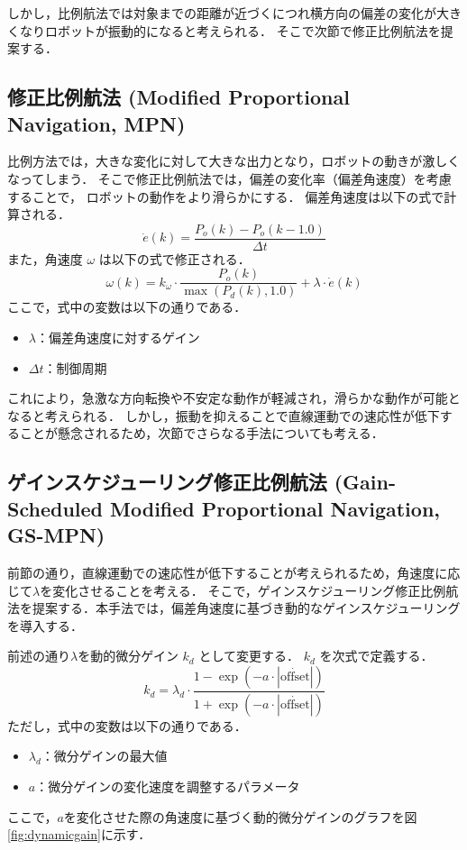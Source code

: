 しかし，比例航法では対象までの距離が近づくにつれ横方向の偏差の変化が大きくなりロボットが振動的になると考えられる．
そこで次節で修正比例航法を提案する．

\subsection{修正比例航法 (Modified Proportional Navigation, MPN)}
比例方法では，大きな変化に対して大きな出力となり，ロボットの動きが激しくなってしまう．
そこで修正比例航法では，偏差の変化率（偏差角速度）を考慮することで，
ロボットの動作をより滑らかにする．
偏差角速度は以下の式で計算される．
\begin{equation}
    \dot{e}(k) = \frac{P_o(k) - P_o(k-1.0)}{\Delta t}
\end{equation}
また，角速度 \(\omega\) は以下の式で修正される．
\begin{equation}
    \omega(k) = k_\omega \cdot \frac{P_o(k)}{\max(P_d(k), 1.0)} + \lambda \cdot \dot{e}(k)
\end{equation}
ここで，式中の変数は以下の通りである．
\begin{itemize}
    \item \(\lambda\)：偏差角速度に対するゲイン
    \item \(\Delta t\)：制御周期
\end{itemize}

これにより，急激な方向転換や不安定な動作が軽減され，滑らかな動作が可能となると考えられる．
しかし，振動を抑えることで直線運動での速応性が低下することが懸念されるため，次節でさらなる手法についても考える．

\subsection{ゲインスケジューリング修正比例航法
    (Gain-Scheduled Modified Proportional Navigation, GS-MPN)}
前節の通り，直線運動での速応性が低下することが考えられるため，角速度に応じて$\lambda$を変化させることを考える．
そこで，ゲインスケジューリング修正比例航法を提案する．本手法では，偏差角速度に基づき動的なゲインスケジューリングを導入する．

前述の通り$\lambda$を動的微分ゲイン \(k_d\) として変更する． \(k_d\) を次式で定義する．
\begin{equation}
    k_d = \lambda_d \cdot \frac{1 - \exp(-a \cdot |\dot{\text{offset}}|)}{1 + \exp(-a \cdot |\dot{\text{offset}}|)}
\end{equation}
ただし，式中の変数は以下の通りである．
\begin{itemize}
    \item \(\lambda_d\)：微分ゲインの最大値
    \item \(a\)：微分ゲインの変化速度を調整するパラメータ
\end{itemize}
ここで，$a$を変化させた際の角速度に基づく動的微分ゲインのグラフを図\ref{fig:dynamicgain}に示す．

